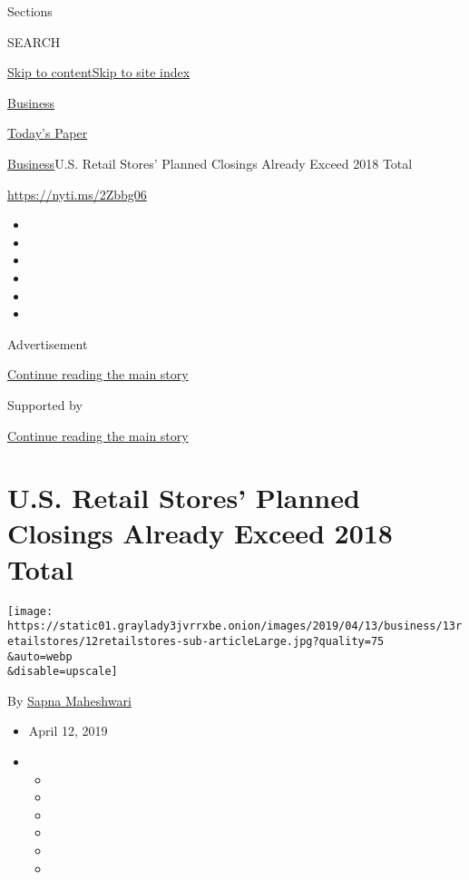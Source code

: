 Sections

SEARCH

\protect\hyperlink{site-content}{Skip to
content}\protect\hyperlink{site-index}{Skip to site index}

\href{https://www.nytimes3xbfgragh.onion/section/business}{Business}

\href{https://myaccount.nytimes3xbfgragh.onion/auth/login?response_type=cookie\&client_id=vi}{}

\href{https://www.nytimes3xbfgragh.onion/section/todayspaper}{Today's
Paper}

\href{/section/business}{Business}\textbar{}U.S. Retail Stores' Planned
Closings Already Exceed 2018 Total

\url{https://nyti.ms/2Zbbg06}

\begin{itemize}
\item
\item
\item
\item
\item
\item
\end{itemize}

Advertisement

\protect\hyperlink{after-top}{Continue reading the main story}

Supported by

\protect\hyperlink{after-sponsor}{Continue reading the main story}

\hypertarget{us-retail-stores-planned-closings-already-exceed-2018-total}{%
\section{U.S. Retail Stores' Planned Closings Already Exceed 2018
Total}\label{us-retail-stores-planned-closings-already-exceed-2018-total}}

\texttt{[image: https://static01.graylady3jvrrxbe.onion/images/2019/04/13/business/13retailstores/12retailstores-sub-articleLarge.jpg?quality=75\\\&auto=webp\\\&disable=upscale]}

By \href{https://www.nytimes3xbfgragh.onion/by/sapna-maheshwari}{Sapna
Maheshwari}

\begin{itemize}
\item
  April 12, 2019
\item
  \begin{itemize}
  \item
  \item
  \item
  \item
  \item
  \item
  \end{itemize}
\end{itemize}

